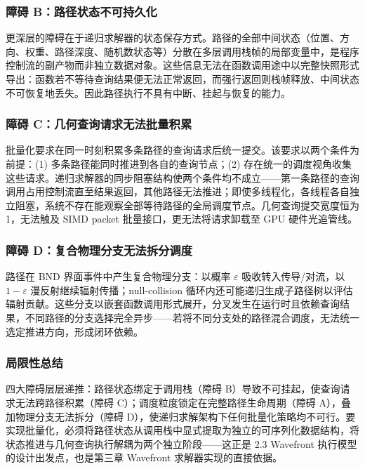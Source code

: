 \subsubsection{障碍 B：路径状态不可持久化}

更深层的障碍在于递归求解器的状态保存方式。路径的全部中间状态（位置、方向、权重、路径深度、随机数状态等）分散在多层调用栈帧的局部变量中，是程序控制流的副产物而非独立数据对象。这些信息无法在函数调用途中以完整快照形式导出：函数若不等待查询结果便无法正常返回，而强行返回则栈帧释放、中间状态不可恢复地丢失。因此路径执行不具有中断、挂起与恢复的能力。

\subsubsection{障碍 C：几何查询请求无法批量积累}

批量化要求在同一时刻积累多条路径的查询请求后统一提交。该要求以两个条件为前提：(1) 多条路径能同时推进到各自的查询节点；(2) 存在统一的调度视角收集这些请求。递归求解器的同步阻塞结构使两个条件均不成立——第一条路径的查询调用占用控制流直至结果返回，其他路径无法推进；即使多线程化，各线程各自独立阻塞，系统不存在能观察全部等待路径的全局调度节点。几何查询提交宽度恒为 1，无法触及 SIMD packet 批量接口，更无法将请求卸载至 GPU 硬件光追管线。

\subsubsection{障碍 D：复合物理分支无法拆分调度}

路径在 BND 界面事件中产生复合物理分支：以概率 $\varepsilon$ 吸收转入传导/对流，以 $1-\varepsilon$ 漫反射继续辐射传播；null-collision 循环内还可能递归生成子路径树以评估辐射贡献。这些分支以嵌套函数调用形式展开，分叉发生在运行时且依赖查询结果，不同路径的分支选择完全异步——若将不同分支处的路径混合调度，无法统一选定推进方向，形成闭环依赖。

\subsubsection{局限性总结}

四大障碍层层递推：路径状态绑定于调用栈（障碍 B）导致不可挂起，使查询请求无法跨路径积累（障碍 C）；调度粒度锁定在完整路径生命周期（障碍 A），叠加物理分支无法拆分（障碍 D），使递归求解架构下任何批量化策略均不可行。要实现批量化，必须将路径状态从调用栈中显式提取为独立的可序列化数据结构，将状态推进与几何查询执行解耦为两个独立阶段——这正是 2.3 Wavefront 执行模型的设计出发点，也是第三章 Wavefront 求解器实现的直接依据。

